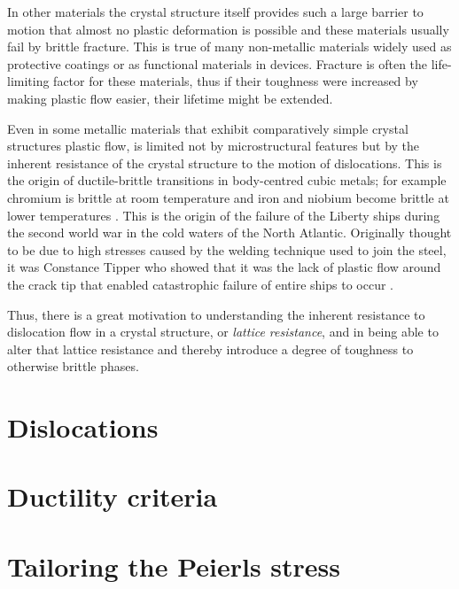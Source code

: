 In other materials the crystal structure itself provides such a large barrier to motion that almost no plastic deformation is possible and these materials usually fail by brittle fracture. This is true of many non-metallic materials widely used as protective coatings or as functional materials in devices. Fracture is often the life-limiting factor for these materials, thus if their toughness were increased by making plastic flow easier, their lifetime might be extended. 

Even in some metallic materials that exhibit comparatively simple crystal structures plastic flow, is limited not by microstructural features but by the inherent resistance of the crystal structure to the motion of dislocations. This is the origin of ductile-brittle transitions in body-centred cubic metals; for example chromium is brittle at room temperature \cite{Harada2004} and iron and niobium become brittle at lower temperatures \cite{Christian1983,Weinberger2013}. This is the origin of the failure of the Liberty ships during the second world war in the cold waters of the North Atlantic. Originally thought to be due to high stresses caused by the welding technique used to join the steel, it was Constance Tipper who showed that it was the lack of plastic flow around the crack tip that enabled catastrophic failure of entire ships to occur \cite{Cottrell1997}. 

Thus, there is a great motivation to understanding the inherent resistance to dislocation flow in a crystal structure, or \emph{lattice resistance}, and in being able to alter that lattice resistance and thereby introduce a degree of toughness to otherwise brittle phases.


\section{Dislocations}  
\label{sec:dislocations}



\section{Ductility criteria}
\label{sec:ductility_criteria}





\section{Tailoring the Peierls stress}
\label{sec:tailor_peierls}




